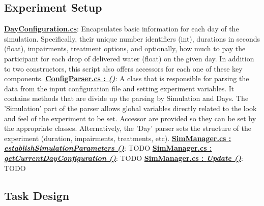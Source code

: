 \documentclass{article}
\begin{document}
\subsection{Experiment Setup} %
\href{https://bit.ly/2FvRTWR}{\textbf{DayConfiguration.cs}}: Encapsulates basic information for each day of the simulation. Specifically, their unique number identifiers (int), durations in seconds (float), impairments, treatment options, and optionally, how much to pay the participant for each drop of delivered water (float) on the given day. In addition to two constructors, this script also offers accessors for each one of these key components. \newline \newline
\href{https://bit.ly/2TZaLYj}{\textbf{ConfigParser.cs : \textit{ ()}}}: A class that is responsible for parsing the data from the input configuration file and setting experiment variables. It contains methods that are divide up the parsing by Simulation and Days. The 'Simulation' part of the parser allows global variables directly related to the look and feel of the experiment to be set. Accessor are provided so they can be set by the appropriate classes. Alternatively, the 'Day' parser sets the structure of the experiment (duration, impairments, treatments, etc). 
\newline \newline
\href{https://bit.ly/2UhmSzq}{\textbf{SimManager.cs : \textit{establishSimulationParameters ()}}}: TODO \newline \newline
\href{https://bit.ly/2UhmSzq}{\textbf{SimManager.cs : \textit{getCurrentDayConfiguration ()}}}: TODO \newline \newline
\href{https://bit.ly/2UhmSzq}{\textbf{SimManager.cs : \textit{Update ()}}}: TODO 

\subsection{Task Design}
\end{document}
